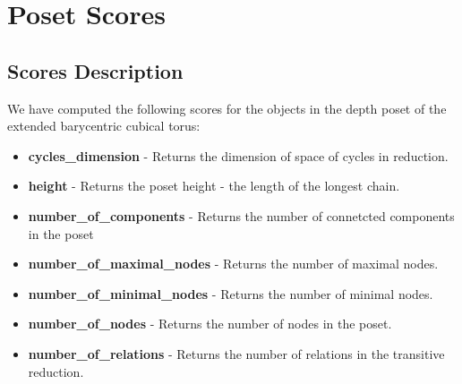 \documentclass{article}
\begin{document}
\section{Poset Scores}
\subsection{Scores Description}
\par We have computed the following scores for the objects in the depth poset of the extended barycentric cubical torus:
\begin{itemize}
\item \textbf{cycles\_dimension} - Returns the dimension of space of cycles in reduction.
\item \textbf{height} - Returns the poset height - the length of the longest chain.
\item \textbf{number\_of\_components} - Returns the number of connetcted components in the poset
\item \textbf{number\_of\_maximal\_nodes} - Returns the number of maximal nodes.
\item \textbf{number\_of\_minimal\_nodes} - Returns the number of minimal nodes.
\item \textbf{number\_of\_nodes} - Returns the number of nodes in the poset.
\item \textbf{number\_of\_relations} - Returns the number of relations in the transitive reduction.
\end{itemize}
\end{document}
